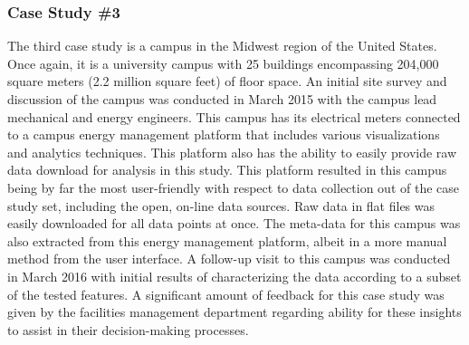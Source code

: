 \subsubsection{Case Study \#3}
\label{sec:casestudy3}

The third case study is a campus in the Midwest region of the United States. Once again, it is a university campus with 25 buildings encompassing 204,000 square meters (2.2 million square feet) of floor space. An initial site survey and discussion of the campus was conducted in March 2015 with the campus lead mechanical and energy engineers. This campus has its electrical meters connected to a campus energy management platform that includes various visualizations and analytics techniques. This platform also has the ability to easily provide raw data download for analysis in this study. This platform resulted in this campus being by far the most user-friendly with respect to data collection out of the case study set, including the open, on-line data sources. Raw data in flat files was easily downloaded for all data points at once. The meta-data for this campus was also extracted from this energy management platform, albeit in a more manual method from the user interface. A follow-up visit to this campus was conducted in March 2016 with initial results of characterizing the data according to a subset of the tested features. A significant amount of feedback for this case study was given by the facilities management department regarding ability for these insights to assist in their decision-making processes. 

